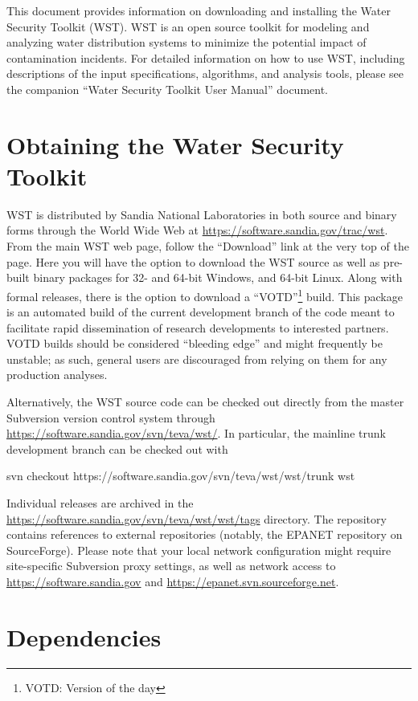 This document provides information on downloading and installing the
Water Security Toolkit (WST). WST is an open source toolkit for
modeling and analyzing water distribution systems to minimize the
potential impact of contamination incidents. For detailed information
on how to use WST, including descriptions of the input specifications,
algorithms, and analysis tools, please see the companion ``Water
Security Toolkit User Manual'' document.

\section{Obtaining the Water Security Toolkit}\label{S:getting_wst}

WST is distributed by Sandia National Laboratories in both source and
binary forms through the World Wide Web at
\url{https://software.sandia.gov/trac/wst}. From the main WST web page,
follow the ``Download'' link at the very top of the page. Here you will
have the option to download the WST source as well as pre-built binary
packages for 32- and 64-bit Windows, and 64-bit Linux. Along with
formal releases, there is the option to download a
``VOTD''\footnote{VOTD: Version of the day} build. This package is an
automated build of the current development branch of the code meant to
facilitate rapid dissemination of research developments to interested
partners. VOTD builds should be considered ``bleeding edge'' and might
frequently be unstable; as such, general users are discouraged from
relying on them for any production analyses.

Alternatively, the WST source code can be checked out directly from the
master Subversion version control system through
\url{https://software.sandia.gov/svn/teva/wst/}. In particular, the
mainline trunk development branch can be checked out with
\begin{unknownListing}
svn checkout https://software.sandia.gov/svn/teva/wst/wst/trunk wst
\end{unknownListing}
Individual releases are archived in the
\url{https://software.sandia.gov/svn/teva/wst/wst/tags} directory. The
repository contains references to external repositories (notably, the
EPANET repository on SourceForge). Please note that your local network
configuration might require site-specific Subversion proxy settings, as
well as network access to \url{https://software.sandia.gov} and
\url{https://epanet.svn.sourceforge.net}.

\section{Dependencies}\label{S:dependencies}


